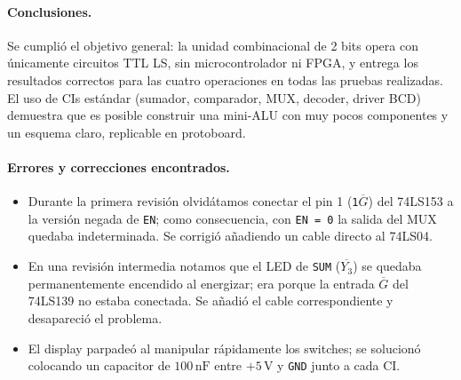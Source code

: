 \documentclass[a4paper,12pt]{article}
\begin{document}
\paragraph{Conclusiones.} Se cumpli\'{o} el objetivo general: la unidad
combinacional de 2 bits opera con \'{u}nicamente circuitos TTL LS, sin
microcontrolador ni FPGA, y entrega los resultados correctos para las
cuatro operaciones en todas las pruebas realizadas. El uso de CIs
est\'{a}ndar (sumador, comparador, MUX, decoder, driver BCD) demuestra
que es posible construir una mini-ALU con muy pocos componentes y un
esquema claro, replicable en protoboard.

\paragraph{Errores y correcciones encontrados.}
\begin{itemize}[leftmargin=*, itemsep=2pt]
  \item Durante la primera revisi\'{o}n olvid\'{a}tamos conectar el
        pin 1 (\texttt{1$\overline{G}$}) del 74LS153 a la versi\'{o}n
        negada de \texttt{EN}; como consecuencia, con \texttt{EN = 0}
        la salida del MUX quedaba indeterminada. Se corrigi\'{o}
        a\~{n}adiendo un cable directo al 74LS04.
  \item En una revisi\'{o}n intermedia notamos que el LED de
        \texttt{SUM} (\texttt{$\overline{Y_3}$}) se quedaba
        permanentemente encendido al energizar; era porque la entrada
        $\overline{G}$ del 74LS139 no estaba conectada. Se a\~{n}adi\'{o}
        el cable correspondiente y desapareci\'{o} el problema.
  \item El display parpade\'{o} al manipular r\'{a}pidamente los
        switches; se solucion\'{o} colocando un capacitor de
        $100\,\mathrm{nF}$ entre $+5\,\mathrm{V}$ y \texttt{GND}
        junto a cada CI.
\end{itemize}
\end{document}
